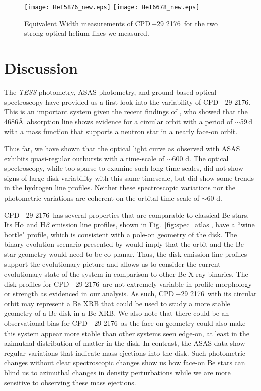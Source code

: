 \documentclass[]{aastex631}
\newcommand{\target}{CPD\,$-$29 2176}
\begin{document}
\begin{figure}
    \centering
    \texttt{[image: HeI5876\_new.eps]}
    \texttt{[image: HeI6678\_new.eps]}
    \caption{Equivalent Width measurements of \target\ for the two strong optical helium lines we measured. }
    \label{fig:equivalent width - helium}
\end{figure}


\section{Discussion}

The \textit{TESS} photometry, ASAS photometry, and ground-based optical spectroscopy have provided us a first look into the variability of \target. This is an important system given the recent findings of \citet{noel}, who showed that the  4686\AA\ absorption line shows evidence for a circular orbit with a period of $\sim$59\,d with a mass function that supports a neutron star in a nearly face-on orbit. 

Thus far, we have shown that the optical light curve as observed with ASAS exhibits quasi-regular outbursts with a time-scale of $\sim$600 d. The optical spectroscopy, while too sparse to examine such long time scales, did not show signs of large disk variability with this same timescale, but did show some trends in the hydrogen line profiles. Neither these spectroscopic variations nor the photometric variations are coherent on the orbital time scale of $\sim$60 d. 



\target\ has several properties that are comparable to classical Be stars. Its H$\alpha$ and H$\beta$ emission line profiles, shown in Fig.~\ref{fig:spec_atlas}, have a ``wine bottle" profile, which is consistent with a pole-on geometry of the disk. The binary evolution scenario presented by \citet{noel} would imply that the orbit and the Be star geometry would need to be co-planar. Thus, the disk emission line profiles support the evolutionary picture and allows us to consider the current evolutionary state of the system in comparison to other Be X-ray binaries. The disk profiles for \target\ are not extremely variable in profile morphology or strength as evidenced in our analysis. As such, \target\ with its circular orbit may represent a Be XRB that could be used to study a more stable geometry of a Be disk in a Be XRB. We also note that there could be an observational bias for \target\, as the face-on geometry could also make this system appear more stable than other systems seen edge-on, at least in the azimuthal distribution of matter in the disk. In contrast, the ASAS data show regular variations that indicate mass ejections into the disk. Such photometric changes without clear spectroscopic changes show us how face-on Be stars can blind us to azimuthal changes in density perturbations while we are more sensitive to observing these mass ejections.
\end{document}

